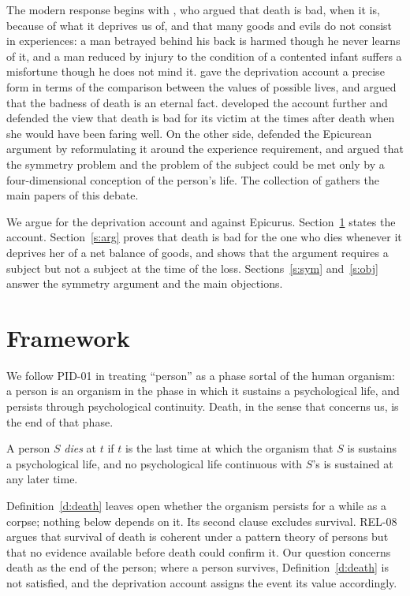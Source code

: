 \documentclass{situationist-preprint}
\begin{document}
The modern response begins with \citet{Nagel1970}, who argued that death is bad, when it is, because of what it deprives us of, and that many goods and evils do not consist in experiences: a man betrayed behind his back is harmed though he never learns of it, and a man reduced by injury to the condition of a contented infant suffers a misfortune though he does not mind it. \citet{Feldman1991,Feldman1992} gave the deprivation account a precise form in terms of the comparison between the values of possible lives, and argued that the badness of death is an eternal fact. \citet{Bradley2009} developed the account further and defended the view that death is bad for its victim at the times after death when she would have been faring well. On the other side, \citet{Rosenbaum1986} defended the Epicurean argument by reformulating it around the experience requirement, and \citet{Silverstein1980} argued that the symmetry problem and the problem of the subject could be met only by a four-dimensional conception of the person's life. The collection of \citet{Fischer1993} gathers the main papers of this debate.

We argue for the deprivation account and against Epicurus. Section~\ref{s:frame} states the account. Section~\ref{s:arg} proves that death is bad for the one who dies whenever it deprives her of a net balance of goods, and shows that the argument requires a subject but not a subject at the time of the loss. Sections~\ref{s:sym} and~\ref{s:obj} answer the symmetry argument and the main objections.

\section{Framework}\label{s:frame}

We follow PID-01 in treating \enquote{person} as a phase sortal of the human organism: a person is an organism in the phase in which it sustains a psychological life, and persists through psychological continuity. Death, in the sense that concerns us, is the end of that phase.

\begin{definition}[Death]\label{d:death}
A person $S$ \emph{dies} at $t$ if $t$ is the last time at which the organism that $S$ is sustains a psychological life, and no psychological life continuous with $S$'s is sustained at any later time.
\end{definition}

Definition~\ref{d:death} leaves open whether the organism persists for a while as a corpse; nothing below depends on it. Its second clause excludes survival. REL-08 argues that survival of death is coherent under a pattern theory of persons but that no evidence available before death could confirm it. Our question concerns death as the end of the person; where a person survives, Definition~\ref{d:death} is not satisfied, and the deprivation account assigns the event its value accordingly.
\end{document}
